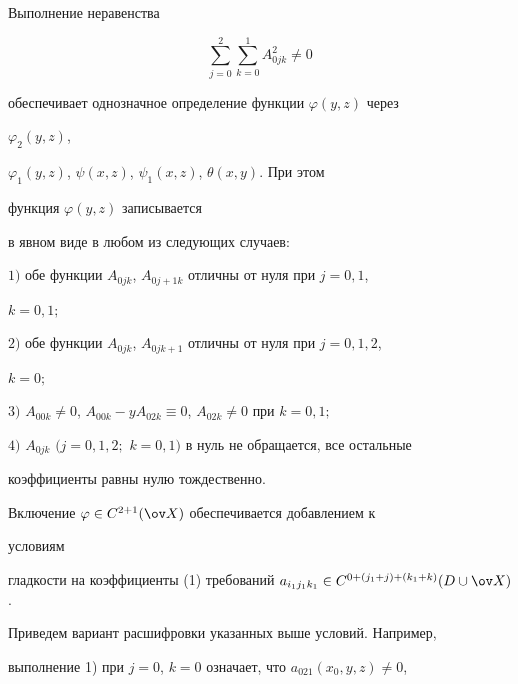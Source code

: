 \begin{thm} 


Выполнение неравенства 


\begin{equation} 


\sum^2_{j=0}\sum^1_{k=0}A^2_{0jk}\ne0 


\end{equation} 


обеспечивает однозначное определение функции $\varphi(y,z)$ через 


$\varphi_2(y,z)$, 


$\varphi_1(y,z)$, $\psi(x,z)$, $\psi_1(x,z)$, $\theta(x,y)$. При этом 


функция $\varphi(y,z)$ записывается 


в явном виде в любом из следующих случаев\/${:}$ 


 


$1)$ обе функции $A_{0jk}$, $A_{0j+1k}$ отличны от нуля при $j=0,1$, 


$k=0,1;$ 


 


$2)$ обе функции $A_{0jk}$, $A_{0jk+1}$ отличны от нуля при $j=0,1,2$, 


$k=0;$ 


 


$3)$ $A_{00k}\ne0$, $A_{00k}-y A_{02k}\equiv0$, $A_{02k}\ne0$ при $k=0,1;$ 


 


$4)$ $A_{0jk}$ $(j=0,1,2;$ $k=0,1)$ в нуль не обращается, все остальные 


коэффициенты равны нулю тождественно. 


\end{thm} 


 


Включение $\varphi\in C^{2+1}(\ov X)$ обеспечивается добавлением к 


условиям 


гладкости на коэффициенты (1) требований $a_{i_1j_1k_1}\in 


C^{0+(j_1+j)+(k_1+k)}(D\cup\ov X)$. 


 


Приведем вариант расшифровки указанных выше условий. Например, 


выполнение 1) при $j=0$, $k=0$ означает, что $a_{021}(x_0,y,z)\ne0$, 


